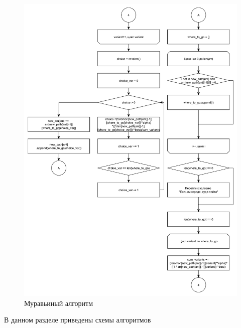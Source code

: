 \documentclass[main.tex]{subfiles}
\begin{document}
	\begin{figure}[H]
		\centering
		\includegraphics[scale=0.5]{src/img/2.2}
		\caption{Муравьиный алгоритм}
		\label{fig:2.2}
	\end{figure}
	
	В данном разделе приведены схемы алгоритмов
		
\end{document}
